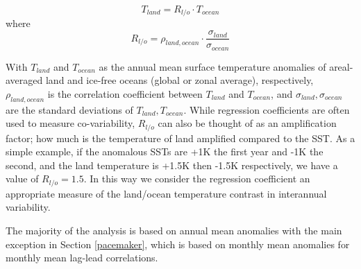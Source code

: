 \begin{equation}
T_{land} = R_{l/o} \cdot T_{ocean}
\end{equation}
where
\begin{equation}
	R_{l/o} = \rho_{land,ocean}\cdot \frac{\sigma_{land}}{\sigma_{ocean}}
\end{equation}

With $T_{land}$ and $T_{ocean}$ as the annual mean surface temperature anomalies 
of areal-averaged land and ice-free oceans (global or zonal average), 
respectively, $\rho_{land,ocean}$ is the correlation coefficient between 
$T_{land}$ and $T_{ocean}$, and $\sigma_{land}, \sigma_{ocean}$ are the standard 
deviations of $T_{land}, T_{ocean}$. While regression coefficients are often 
used to measure co-variability, $R_{l/o}$ can also be thought of as an 
amplification factor; how much is the temperature of land amplified compared to 
the SST.  As a simple example, if the anomalous SSTs are +1K the first year and 
-1K the second, and the land temperature is +1.5K then -1.5K respectively, we 
have a value of $R_{l/o} = 
1.5$. In this way we consider the regression coefficient an appropriate measure 
of the land/ocean temperature contrast in interannual variability.

The majority of the analysis is based on annual mean anomalies with the main 
exception in Section \ref{pacemaker}, which is based on monthly mean anomalies 
for monthly mean lag-lead correlations. 
